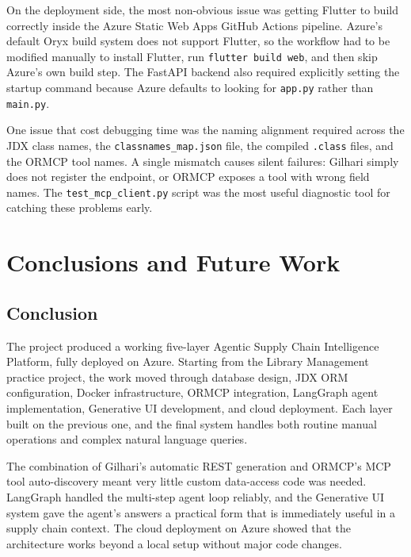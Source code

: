 \documentclass{book}
\begin{document}
On the deployment side, the most non-obvious issue was getting Flutter to build correctly inside the Azure Static Web Apps GitHub Actions pipeline. Azure's default Oryx build system does not support Flutter, so the workflow had to be modified manually to install Flutter, run \texttt{flutter build web}, and then skip Azure's own build step. The FastAPI backend also required explicitly setting the startup command because Azure defaults to looking for \texttt{app.py} rather than \texttt{main.py}.

One issue that cost debugging time was the naming alignment required across the JDX class names, the \texttt{classnames\_map.json} file, the compiled \texttt{.class} files, and the ORMCP tool names. A single mismatch causes silent failures: Gilhari simply does not register the endpoint, or ORMCP exposes a tool with wrong field names. The \texttt{test\_mcp\_client.py} script was the most useful diagnostic tool for catching these problems early.


\chapter{Conclusions and Future Work}

\section{Conclusion}

The project produced a working five-layer Agentic Supply Chain Intelligence Platform, fully deployed on Azure. Starting from the Library Management practice project, the work moved through database design, JDX ORM configuration, Docker infrastructure, ORMCP integration, LangGraph agent implementation, Generative UI development, and cloud deployment. Each layer built on the previous one, and the final system handles both routine manual operations and complex natural language queries.

The combination of Gilhari's automatic REST generation and ORMCP's MCP tool auto-discovery meant very little custom data-access code was needed. LangGraph handled the multi-step agent loop reliably, and the Generative UI system gave the agent's answers a practical form that is immediately useful in a supply chain context. The cloud deployment on Azure showed that the architecture works beyond a local setup without major code changes.
\end{document}
